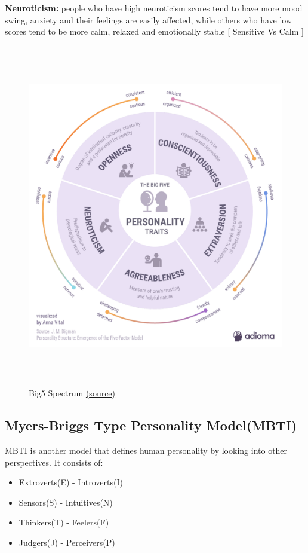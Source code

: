 \textbf{Neuroticism: } people who have high neuroticism scores tend to have more mood swing, anxiety and their feelings are easily affected, while others who have low scores tend to be more calm, relaxed and emotionally stable [ Sensitive Vs Calm ]\newline



\begin{figure}[h]
\centering
\includegraphics[width=15cm,height=15cm]{images/big5.png}
\caption{Big5 Spectrum \href{https://blog.adioma.com/wp-content/uploads/2018/11/big-five-personality-traits-infographic.png}{(\underline{source})}}
\end{figure}

\subsection{Myers-Briggs Type Personality Model(MBTI)}
\label{sec:mbti_ls}
MBTI is another model that defines human personality by looking into other perspectives. It consists of:
\begin{itemize}
  \item Extroverts(E) - Introverts(I)
  \item Sensors(S) - Intuitives(N)
  \item Thinkers(T) - Feelers(F)
  \item Judgers(J) - Perceivers(P)
\end{itemize}


